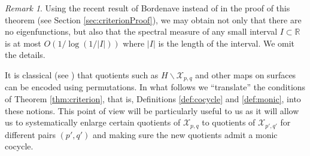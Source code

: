 \documentclass[11pt]{article}
\theoremstyle{remark}
\newtheorem{remark}[theorem]{Remark}
\newcommand{\cX}{\mathcal X}
\newcommand{\R}{\mathbb R}
\begin{document}
\begin{remark}\label{rmk:Bordenave} Using the recent result of Bordenave \cite[Theorem 4]{Bordenave2026} instead of \cite[Theorem 2.3]{BSV17} in the proof of this theorem (see Section \ref{sec:criterionProof}), we may obtain not only that there are no eigenfunctions, but also that the spectral measure of any small interval $I \subset \R$ is at most $O(1/\log(1/|I|))$ where $|I|$ is the length of the interval. We omit the details.    
\end{remark}

It is classical (see \cite{GarethSingerman78}) that quotients such as $H \backslash \cX_{p,q}$ and other maps on surfaces  can be encoded using permutations. In what follows we ``translate'' the conditions of Theorem \ref{thm:criterion}, that is, Definitions \ref{def:cocycle} and \ref{def:monic}, into these notions. This point of view will be particularly useful to us as it will allow us to systematically enlarge certain quotients of $\cX_{p,q}$ to quotients of $\cX_{p',q'}$ for different pairs $(p',q')$ and making sure the new quotients admit a monic cocycle. 
\end{document}
